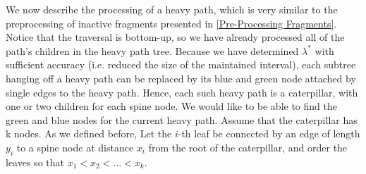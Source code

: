 \documentclass[11pt,a4paper]{article}
\theoremstyle{definition}
\theoremstyle{remark}
\begin{document}
We now describe the processing of a heavy path, which is very similar to the preprocessing of inactive fragments presented in \ref{Pre-Processing Fragments}. Notice that the traversal is bottom-up, so we have already processed all of the path's children in the heavy path tree. Because we have determined $\lambda^*$ with sufficient accuracy (i.e. reduced the size of the maintained interval), each subtree hanging off a heavy path can be replaced by its blue and green node attached by single edges to the heavy path. Hence, each such heavy path is a caterpillar, with one or two children for each spine node. We would like to be able to find the green and blue nodes for the current heavy path. %
Assume that the caterpillar has k nodes. As we defined before, Let the $i$-th leaf be connected by an edge of length $y_i$ to a spine node at distance $x_i$ from the root of the caterpillar, and order the leaves so that $x_1 < x_2 < ... < x_k$.
\end{document}
